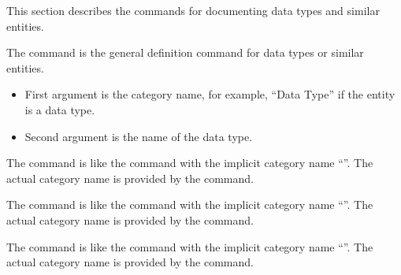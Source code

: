 \documentclass{scrartcl}
\begin{document}
{
This section describes the commands for documenting data types and
similar entities.

\begin{definition}
  
The  command is the general definition command for data
types or similar entities.
\begin{itemize}
\item First argument  is the category name, for
example, “Data Type” if the entity is a data type.
\item Second argument  is the name of the data type.
\end{itemize}
\end{definition}

\begin{definition}
 
The  command is like the  command with
the implicit category name “”.  The actual category name
is provided by the  command.
\end{definition}

\begin{definition}
 
The  command is like the  command with
the implicit category name “”.  The actual category name
is provided by the  command.
\end{definition}

\begin{definition}
 
The  command is like the  command with
the implicit category name “”.  The actual category name
is provided by the  command.
\end{definition}

}
\end{document}

